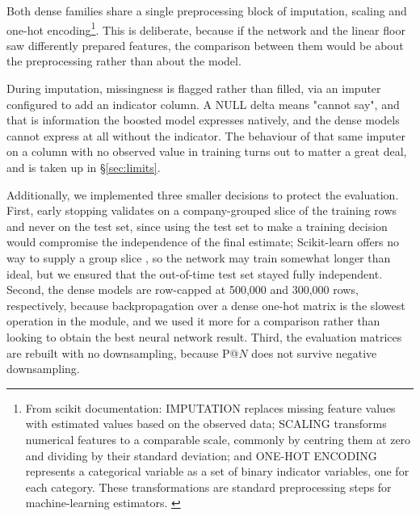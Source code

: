 \documentclass[    author={Samuel Menon Demelo; Sneha Saphala Ram Prasad; 
Viktor Ander Lindholm; Vishal Khatri},
               supervisor={Prof. Fernando Moreno-Pino},
                   degree={MSc},
                    title={Lloyds Commercial Banking Intelligence},
                 subtitle={Ranking SME Lending, Risk and Growth Prospects for Lloyds Banking Group},
                     type={},
                     year={2026}]{dissertation}
\begin{document}
Both dense families share a single preprocessing block of imputation, scaling and one-hot encoding\footnote{From scikit documentation: IMPUTATION replaces missing feature values with estimated values based on the observed data; SCALING transforms numerical features to a comparable scale, commonly by centring them at zero and dividing by their standard deviation; and ONE-HOT ENCODING represents a categorical variable as a set of binary indicator variables, one for each category. These transformations are standard preprocessing steps for machine-learning estimators. \cite{scikit_learn_preprocessing}}. This is deliberate, because if the network and the linear floor saw differently prepared features, the comparison between them would be about the preprocessing rather than about the model.

During imputation, missingness is flagged rather than filled, via an imputer configured to add an indicator column. A NULL delta means "cannot say", and that is information the boosted model expresses natively, and the dense models cannot express at all without the indicator. The behaviour of that same imputer on a column with no observed value in training turns out to matter a great deal, and is taken up in \S\ref{sec:limits}.



Additionally, we implemented three smaller decisions to protect the evaluation. First, early stopping validates on a company-grouped slice of the training rows and never on the test set, since using the test set to make a training decision would compromise the independence of the final estimate; Scikit-learn offers no way to supply a group slice \cite{scikit-learn_early_stopping_gradient_boosting}, so the network may train somewhat longer than ideal, but we ensured that the out-of-time test set stayed fully independent. Second, the dense models are row-capped at 500,000 and 300,000 rows, respectively, because backpropagation over a dense one-hot matrix is the slowest operation in the module, and we used it more for a comparison rather than looking to obtain the best neural network result. Third, the evaluation matrices are rebuilt with no downsampling, because P@$N$ does not survive negative downsampling.
\end{document}

